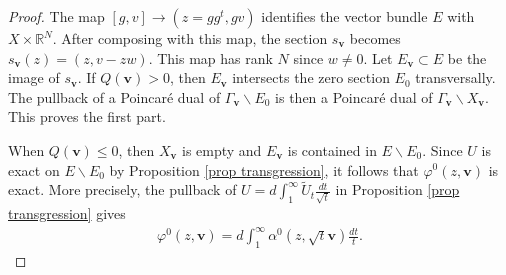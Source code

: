 \documentclass[a4paper,11pt]{amsart} %
\newcommand{\8}{\infty}
\newcommand{\vbf}{\mathbf{v}}
\newcommand{\Util}{\widetilde{U}}
\newcommand{\R}{\mathbb{R}}
\newcommand{\Th}{\mathrm{Th}}
\theoremstyle{mytheoremstyle}
\newtheorem{prop}[thm]{Proposition}
\theoremstyle{remark}
\numberwithin{equation}{section}
\begin{document}
\begin{proof} The map $[g,v]  \longrightarrow (z=gg^t,gv)$ identifies the vector bundle $E$ with  $X \times \R^N$. After composing with this map, the section $s_\vbf$ becomes $s_\vbf(z)=(z,v-zw)$. This map has rank $N$ since $w \neq 0$.  Let $E_\vbf \subset E$ be the image of $s_\vbf$. If $Q(\vbf)>0$, then $E_\vbf$ intersects the zero section $E_0$ transversally. The pullback of a Poincaré dual of $\Gamma_\vbf \backslash E_0$ is then a Poincaré dual of $\Gamma_\vbf \backslash X_\vbf$. This proves the first part.

When $Q(\vbf) \leq 0$, then $X_\vbf$ is empty and $E_\vbf$ is contained in $E \smallsetminus E_0$. Since $U$ is exact on $E \smallsetminus E_0$ by Proposition \ref{prop transgression}, it follows that $\varphi^0(z,\vbf)$ is exact. More precisely, the pullback of $U= d \int_1^\8 \Util_t \frac{dt}{\sqrt{t}}$ in Proposition \ref{prop transgression} gives
\begin{align}
\varphi^0(z,\vbf)=d\int_1^\8 \alpha^{0}(z,\sqrt{t}\vbf) \frac{dt}{t}.
\end{align}

\end{proof}
%
\end{document}
